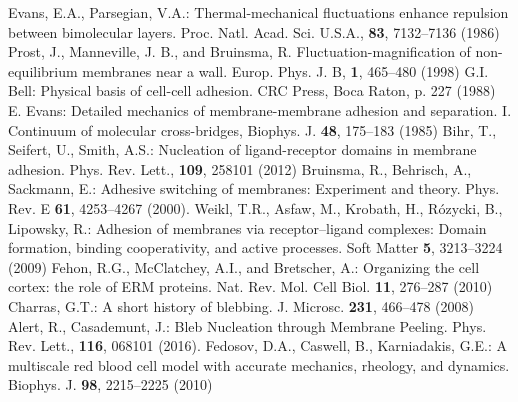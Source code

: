 \documentclass[graybox]{svmult}
\begin{document}
\begin{thebibliography}{99.}
%
Evans, E.A., Parsegian, V.A.: Thermal-mechanical fluctuations enhance repulsion between bimolecular layers. Proc. Natl. Acad. Sci. U.S.A., \textbf{83}, 7132--7136 (1986)
%
Prost, J., Manneville, J. B., and Bruinsma, R. Fluctuation-magnification of non-equilibrium membranes near a wall. Europ. Phys. J. B, \textbf{1}, 465--480 (1998)
%
G.I. Bell: Physical basis of cell-cell adhesion. CRC Press, Boca Raton, p. 227 (1988)
%
E. Evans: Detailed mechanics of membrane-membrane adhesion and separation. I. Continuum of molecular cross-bridges, Biophys. J. \textbf{48}, 175--183 (1985)
%
Bihr, T., Seifert, U., Smith, A.S.: Nucleation of ligand-receptor domains in membrane adhesion. Phys. Rev. Lett., \textbf{109}, 258101 (2012)
%
Bruinsma, R., Behrisch, A., Sackmann, E.: Adhesive switching of membranes: Experiment and theory. Phys. Rev. E \textbf{61}, 4253--4267 (2000).
%
Weikl, T.R., Asfaw, M., Krobath, H., R\'{o}zycki, B., Lipowsky, R.: Adhesion of membranes via receptor–ligand complexes: Domain formation, binding cooperativity, and active processes. Soft Matter \textbf{5}, 3213--3224 (2009)
%
Fehon, R.G., McClatchey, A.I., and Bretscher, A.: Organizing the cell cortex: the role of ERM proteins. Nat. Rev. Mol. Cell Biol. \textbf{11}, 276--287 (2010)
%
Charras, G.T.: A short history of blebbing. J. Microsc. \textbf{231}, 466--478 (2008)
%
Alert, R., Casademunt, J.: Bleb Nucleation through Membrane Peeling. Phys. Rev. Lett., \textbf{116}, 068101 (2016).
%
Fedosov, D.A., Caswell, B., Karniadakis, G.E.: A multiscale red blood cell model with accurate mechanics, rheology, and dynamics. Biophys. J. \textbf{98}, 2215--2225 (2010)
%
\end{thebibliography}
\end{document}
